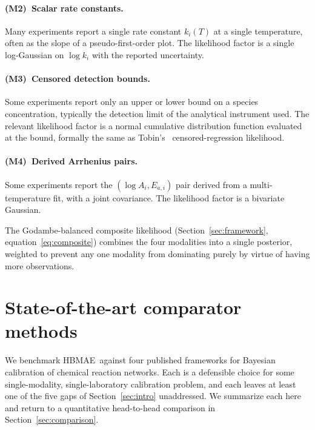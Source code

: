 \documentclass[12pt]{article}
\theoremstyle{plain}
\theoremstyle{definition}
\theoremstyle{remark}
\newcommand{\HBMAE}{HBMAE\xspace}
\begin{document}
\paragraph{(M2)~Scalar rate constants.}  Many experiments report a single
rate constant $k_i(T)$ at a single temperature, often as the slope of a
pseudo-first-order plot.  The likelihood factor is a single log-Gaussian on
$\log k_i$ with the reported uncertainty.

\paragraph{(M3)~Censored detection bounds.}  Some experiments report only an
upper or lower bound on a species concentration, typically the detection
limit of the analytical instrument used.  The relevant likelihood factor is
a normal cumulative distribution function evaluated at the bound, formally
the same as Tobin's~\citep{Tobin1958} censored-regression likelihood.

\paragraph{(M4)~Derived Arrhenius pairs.}  Some experiments report the
$(\log A_i, E_{a,i})$ pair derived from a multi-temperature fit, with a
joint covariance.  The likelihood factor is a bivariate Gaussian.

The Godambe-balanced composite likelihood
(Section~\ref{sec:framework}, equation~\eqref{eq:composite}) combines the
four modalities into a single posterior, weighted to prevent any one
modality from dominating purely by virtue of having more observations.

\section{State-of-the-art comparator methods}\label{sec:sota}

We benchmark \HBMAE\ against four published frameworks for Bayesian calibration
of chemical reaction networks.  Each is a defensible choice for some
single-modality, single-laboratory calibration problem, and each leaves at
least one of the five gaps of Section~\ref{sec:intro} unaddressed.  We
summarize each here and return to a quantitative head-to-head comparison in
Section~\ref{sec:comparison}.
\end{document}
